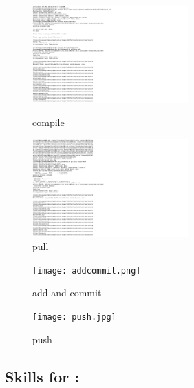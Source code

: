 \documentclass[a4paper, 11pt]{report}
\begin{document}
\begin{figure}[htbp]
\centering
\begin{minipage}[t]{0.48\textwidth}
\centering
\includegraphics[width=6cm]{compile.png}
\caption{compile}
\end{minipage}
\begin{minipage}[t]{0.48\textwidth}
\centering
\includegraphics[width=6cm]{pull.jpg}
\caption{pull}
\end{minipage}
\end{figure}

\begin{figure}[htbp]
\centering
\begin{minipage}[t]{0.48\textwidth}
\centering
\texttt{[image: addcommit.png]}
\caption{add and commit}
\end{minipage}
\begin{minipage}[t]{0.48\textwidth}
\centering
\texttt{[image: push.jpg]}
\caption{push}
\end{minipage}
\end{figure}
\clearpage






\subsection{Skills for \majC: \studC}
\end{document}
